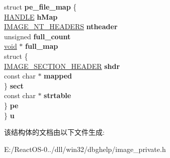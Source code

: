 \begin{DoxyCompactItemize}
\begin{tabbing}
\>struct {\bfseries pe\_file\_map} \{\\
\>\>\hyperlink{interfacevoid}{HANDLE} {\bfseries hMap}\\
\>\>\hyperlink{struct___i_m_a_g_e___n_t___h_e_a_d_e_r_s}{IMAGE\_NT\_HEADERS} {\bfseries ntheader}\\
\>\>unsigned {\bfseries full\_count}\\
\>\>\hyperlink{interfacevoid}{void} $\ast$ {\bfseries full\_map}\\
\>\>struct \{\\
\>\>\>\hyperlink{struct___i_m_a_g_e___s_e_c_t_i_o_n___h_e_a_d_e_r}{IMAGE\_SECTION\_HEADER} {\bfseries shdr}\\
\>\>\>const char $\ast$ {\bfseries mapped}\\
\>\>\} {\bfseries sect}\\
\>\>const char $\ast$ {\bfseries strtable}\\
\>\} {\bfseries pe}\\
\} {\bfseries u}\\

\end{tabbing}\end{DoxyCompactItemize}


该结构体的文档由以下文件生成\+:\begin{DoxyCompactItemize}
\item 
E\+:/\+React\+O\+S-\/0../dll/win32/dbghelp/image\+\_\+private.\+h\end{DoxyCompactItemize}
